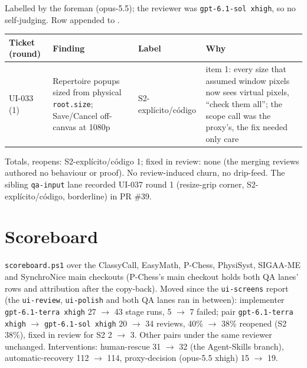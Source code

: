 \documentclass[11pt,a4paper]{article}
\begin{document}
Labelled by the foreman (opus-5.5); the reviewer was \texttt{gpt-6.1-sol xhigh}, so no
self-judging. Row appended to .

{\small\noindent
\begin{tabularx}{\linewidth}{@{}>{\raggedright\arraybackslash}p{1.7cm}X>{\raggedright\arraybackslash}p{2.7cm}X@{}}
\toprule
Ticket (round) & Finding & Label & Why \\
\midrule
UI-033 (1) & Repertoire popups sized from physical \texttt{root.size}; Save/Cancel off-canvas at 1080p & S2-explícito/\allowbreak código & item 1: every size that assumed window pixels now sees virtual pixels, ``check them all''; the scope call was the proxy's, the fix needed only care \\
\bottomrule
\end{tabularx}
}

Totals, reopens: S2-explícito/código 1; fixed in review: none (the merging reviews authored no
behaviour or proof). No review-induced churn, no drip-feed. The sibling \texttt{qa-input} lane
recorded UI-037 round 1 (resize-grip corner, S2-explícito/código, borderline) in PR \#39.

\section*{Scoreboard}

\texttt{scoreboard.ps1} over the ClassyCall, EasyMath, P-Chess, PhysiSyst, SIGAA-ME and SynchroNice
main checkouts (P-Chess's main checkout holds both QA lanes' rows and attribution after the
copy-back). Moved since the \texttt{ui-screens} report (the \texttt{ui-review}, \texttt{ui-polish}
and both QA lanes ran in between): implementer \texttt{gpt-6.1-terra xhigh} 27 $\to$ 43 stage runs,
5 $\to$ 7 failed; pair \texttt{gpt-6.1-terra xhigh} $\rightarrow$ \texttt{gpt-6.1-sol xhigh} 20
$\to$ 34 reviews, 40\% $\to$ 38\% reopened (S2 38\%), fixed in review for S2 2 $\to$ 3. Other pairs
under the same reviewer unchanged. Interventions: human-rescue 31 $\to$ 32 (the Agent-Skills
branch), automatic-recovery 112 $\to$ 114, proxy-decision (opus-5.5 xhigh) 15 $\to$ 19.
\end{document}
